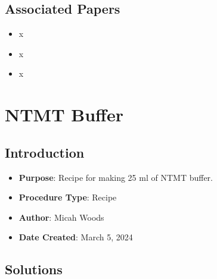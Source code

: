 \documentclass[
  letterpaper,
  DIV=11,
  numbers=noendperiod]{scrreprt}
\providecommand{\tightlist}{%
  \setlength{\itemsep}{0pt}\setlength{\parskip}{0pt}}\usepackage{longtable,booktabs,array}
\begin{document}
\hypertarget{associated-papers-69}{%
\section{Associated Papers}\label{associated-papers-69}}

\begin{itemize}
\tightlist
\item
  x
\item
  x
\item
  x
\end{itemize}

\hypertarget{sec-recipe-NTMT}{%
\chapter{NTMT Buffer}\label{sec-recipe-NTMT}}

\hypertarget{introduction-101}{%
\section{Introduction}\label{introduction-101}}

\begin{itemize}
\tightlist
\item
  \textbf{Purpose}: Recipe for making 25 ml of NTMT buffer.
\item
  \textbf{Procedure Type}: Recipe
\item
  \textbf{Author}: Micah Woods
\item
  \textbf{Date Created}: March 5, 2024
\end{itemize}

\hypertarget{solutions-87}{%
\section{Solutions}\label{solutions-87}}
\end{document}
